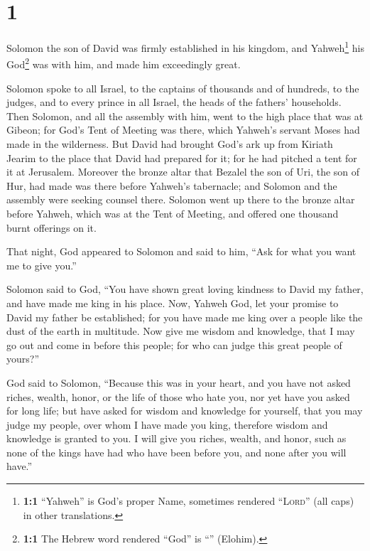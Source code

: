 \hypertarget{section}{%
\section{1}\label{section}}

 Solomon the son of David was firmly established in his
kingdom, and Yahweh\footnote{\textbf{1:1} ``Yahweh'' is God's proper
  Name, sometimes rendered ``\textsc{Lord}'' (all caps) in other
  translations.} his God\footnote{\textbf{1:1} The Hebrew word rendered
  ``God'' is ``'' (Elohim).} was with him, and made him
exceedingly great.

 Solomon spoke to all Israel, to the captains of thousands
and of hundreds, to the judges, and to every prince in all Israel, the
heads of the fathers' households.  Then Solomon, and all
the assembly with him, went to the high place that was at Gibeon; for
God's Tent of Meeting was there, which Yahweh's servant Moses had made
in the wilderness.  But David had brought God's ark up
from Kiriath Jearim to the place that David had prepared for it; for he
had pitched a tent for it at Jerusalem.  Moreover the
bronze altar that Bezalel the son of Uri, the son of Hur, had made was
there before Yahweh's tabernacle; and Solomon and the assembly were
seeking counsel there.  Solomon went up there to the
bronze altar before Yahweh, which was at the Tent of Meeting, and
offered one thousand burnt offerings on it.

 That night, God appeared to Solomon and said to him,
``Ask for what you want me to give you.''

 Solomon said to God, ``You have shown great loving
kindness to David my father, and have made me king in his place.
 Now, Yahweh God, let your promise to David my father be
established; for you have made me king over a people like the dust of
the earth in multitude.  Now give me wisdom and
knowledge, that I may go out and come in before this people; for who can
judge this great people of yours?''

 God said to Solomon, ``Because this was in your heart,
and you have not asked riches, wealth, honor, or the life of those who
hate you, nor yet have you asked for long life; but have asked for
wisdom and knowledge for yourself, that you may judge my people, over
whom I have made you king,  therefore wisdom and
knowledge is granted to you. I will give you riches, wealth, and honor,
such as none of the kings have had who have been before you, and none
after you will have.''


